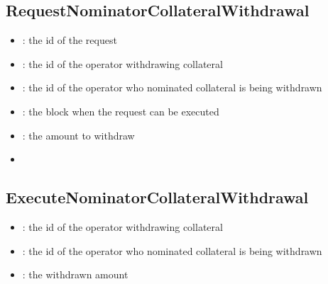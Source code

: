 \documentclass[a4paper,10pt,english]{sphinxmanual}
\begin{document}
\subsection{RequestNominatorCollateralWithdrawal}
\label{\detokenize{spec/nomination:id42}}


\begin{itemize}
\item {} 
: the id of the request

\item {} 
: the id of the operator withdrawing collateral

\item {} 
: the id of the operator who nominated collateral is being withdrawn

\item {} 
: the block when the request can be executed

\item {} 
: the amount to withdraw

\end{itemize}

\begin{itemize}
\item {} 
{\hyperref[\detokenize{spec/nomination:requestnominatorcollateralwithdrawal}]{}}

\end{itemize}


\subsection{ExecuteNominatorCollateralWithdrawal}
\label{\detokenize{spec/nomination:executenominatorcollateralwithdrawal}}


\begin{itemize}
\item {} 
: the id of the operator withdrawing collateral

\item {} 
: the id of the operator who nominated collateral is being withdrawn

\item {} 
: the withdrawn amount

\end{itemize}
\end{document}
